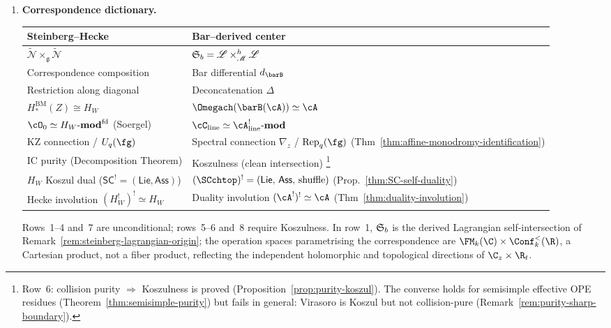 \begin{theorem}
\begin{enumerate}[label=\textup{(\roman*)}]
\item \textbf{Correspondence dictionary.}
 \begin{center}
 \renewcommand{\arraystretch}{1.15}
 \begin{tabular}{@{}ll@{}}
 \toprule
 \textbf{Steinberg--Hecke} & \textbf{Bar--derived center} \\
 \midrule
 $\widetilde{\mathcal{N}} \times_{\mathfrak{g}}
 \widetilde{\mathcal{N}}$
 & $\mathfrak{S}_b = \mathscr{L} \times_{\mathscr{M}}^h
 \mathscr{L}$ \\
 Correspondence composition
 & Bar differential $d_{\barB}$ \\
 Restriction along diagonal
 & Deconcatenation $\Delta$ \\
 $H_\ast^{\mathrm{BM}}(Z) \cong H_W$
 & $\Omegach(\barB(\cA)) \simeq \cA$ \\
 $\cO_0 \simeq H_W\text{-}\mathbf{mod}^{\mathrm{fd}}$ (Soergel)
 & $\cC_{\mathrm{line}} \simeq \cA^!_{\mathrm{line}}\text{-}\mathbf{mod}$ \\
 KZ connection / $U_q(\fg)$
 & Spectral connection $\nabla_z$ / $\mathrm{Rep}_q(\fg)$
 (Thm~\ref{thm:affine-monodromy-identification}) \\
 IC purity (Decomposition Theorem)
 & Koszulness (clean intersection)%
 \footnote{Row~6: collision purity $\Rightarrow$ Koszulness
 is proved (Proposition~\ref{prop:purity-koszul}). The
 converse holds for semisimple effective OPE residues
 (Theorem~\ref{thm:semisimple-purity}) but fails in general:
 Virasoro is Koszul but not collision-pure
 (Remark~\ref{rem:purity-sharp-boundary}).} \\
 $H_W$ Koszul dual ($\mathsf{SC}^! = (\mathsf{Lie}, \mathsf{Ass})$)
 & $(\SCchtop)^! = (\mathsf{Lie},\, \mathsf{Ass},\, \text{shuffle})$
 (Prop.~\ref{thm:SC-self-duality}) \\
 Hecke involution $(H_W^!)^! \simeq H_W$
 & Duality involution $(\cA^!)^! \simeq \cA$
 (Thm~\ref{thm:duality-involution}) \\
 \bottomrule
 \end{tabular}
 \end{center}
 \noindent Rows~1--4 and~7 are unconditional;
 rows~5--6 and~8 require Koszulness.
 In row~1, $\mathfrak{S}_b$ is the derived Lagrangian
 self-intersection of
 Remark~\textup{\ref{rem:steinberg-lagrangian-origin}};
 the operation spaces parametrising the correspondence
 are $\FM_k(\C) \times \Conf_k^{<}(\R)$, a Cartesian
 product, not a fiber product, reflecting the independent
 holomorphic and topological directions of $\C_z \times \R_t$.
\end{enumerate}
\end{theorem}

